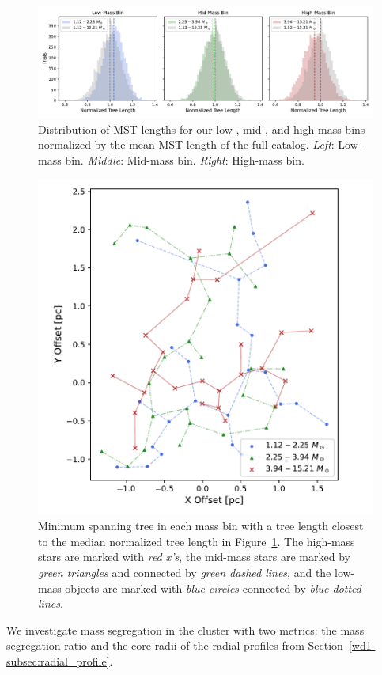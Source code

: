 \documentclass[12pt]{ucsddissertation}
\begin{document}
\begin{CJK*}{UTF8}{gbsn}
\begin{figure}[htb!]
\centering
\includegraphics[width=\linewidth]{figures/chapter2/mst_trails_3_panel_5000_25.pdf}
\caption[Distribution of minimum spanning tree lengths]{Distribution of MST lengths for our low-, mid-, and high-mass bins normalized by the mean MST length of the full catalog. \textit{Left}: Low-mass bin. \textit{Middle}: Mid-mass bin. \textit{Right}: High-mass bin.}
\label{fig:mst_length}
\end{figure}

\begin{figure}[htb!]
    \centering
    \includegraphics[width=0.7\linewidth]{figures/chapter2/minimum_spanning_tree.pdf}
    \caption[Minimum spanning tree in each mass bin]{Minimum spanning tree in each mass bin with a tree length closest to the median normalized tree length in Figure~\ref{fig:mst_length}. The high-mass stars are marked with {\em red x's}, the mid-mass stars are marked by {\em green triangles} and connected by {\em green dashed lines}, and the low-mass objects are marked with {\em blue circles} connected by {\em blue dotted lines}.}
    \label{fig:mst}
\end{figure}

We investigate mass segregation in the cluster with two metrics: the mass segregation ratio and the core radii of the radial profiles from Section~\ref{wd1-subsec:radial_profile}.


\end{CJK*}
\end{document}
